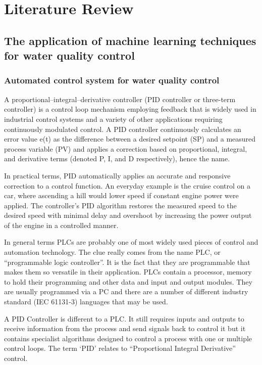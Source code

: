 \chapter{Literature Review}

\section{The application of machine learning techniques for water quality control}
\subsection{Automated control system for water quality control}
A proportional–integral–derivative controller (PID controller or three-term controller) is a control loop mechanism employing feedback that is widely used in industrial control systems and a variety of other applications requiring continuously modulated control. A PID controller continuously calculates an error value e(t) as the difference between a desired setpoint (SP) and a measured process variable (PV) and applies a correction based on proportional, integral, and derivative terms (denoted P, I, and D respectively), hence the name.




In practical terms, PID automatically applies an accurate and responsive correction to a control function. An everyday example is the cruise control on a car, where ascending a hill would lower speed if constant engine power were applied. The controller's PID algorithm restores the measured speed to the desired speed with minimal delay and overshoot by increasing the power output of the engine in a controlled manner.

In general terms PLCs are probably one of most widely used pieces of control and automation technology. The clue really comes from the name PLC, or “programmable logic controller”. It is the fact that they are programmable that makes them so versatile in their application. PLCs contain a processor, memory to hold their programming and other data and input and output modules. They are usually programmed via a PC and there are a number of different industry standard (IEC 61131-3) languages that may be used.

A PID Controller is different to a PLC. It still requires inputs and outputs to receive information from the process and send signals back to control it but it contains specialist algorithms designed to control a process with one or multiple control loops. The term ‘PID’ relates to “Proportional Integral Derivative” control. 


